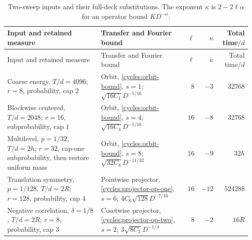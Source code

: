 \begingroup
\small
\setlength{\tabcolsep}{4pt}
\renewcommand{\arraystretch}{1.2}
\begin{longtable}{@{}p{.32\linewidth}p{.31\linewidth}r r r@{}}
\caption{Two-sweep inputs and their full-deck substitutions.
The exponent $\kappa$ is $2-2\ell\alpha$ for an operator bound
$K D^{-\alpha}$.}\label{cycles:transfer-table}\\
\toprule
Input and retained measure & Transfer and Fourier bound
 & $\ell$ & $\kappa$ & Total time$/d$\\
\midrule
\endfirsthead
\toprule
Input and retained measure & Transfer and Fourier bound
 & $\ell$ & $\kappa$ & Total time$/d$\\
\midrule
\endhead
\bottomrule
\endfoot
Coarse energy, $T/d=4096$;\newline
$r=8$, probability, cap $2$
&
Orbit, \eqref{cycles:orbit-bound}, $s=1$;\newline
$\sqrt{16C_1}D^{-5/16}$
& $8$ & $-3$ & $32768$\\
Blockwise centered, $T/d=2048$;\newline
$r=16$, subprobability, cap $1$
&
Orbit, \eqref{cycles:orbit-bound}, $s=4$;\newline
$\sqrt{16C_4}D^{-5/16}$
& $16$ & $-8$ & $32768$\\
Multilevel, $p=1/32$, $T/d=2h$;\newline
$r=32$, cap-one subprobability,\newline
then restore uniform mass
&
Orbit, \eqref{cycles:orbit-bound}, $s=8$;\newline
$\sqrt{32C_8}D^{-11/32}$
& $16$ & $-9$ & $32h$\\
Translation symmetry, $p=1/128$,\newline
$T/d=2R$; $r=128$,\newline
probability, cap $4$
&
Pointwise projector,\newline
\eqref{cycles:projector-op-one}, $s=6$;\newline
$4C_6\sqrt{128}D^{-7/16}$
& $16$ & $-12$ & $524288$\\
Negative correlation, $\delta=1/8$,\newline
$T/d=2R$; $r=8$,\newline
probability, cap $3$
&
Cosetwise projector,\newline
\eqref{cycles:projector-op-two}, $s=2$;\newline
$3\sqrt{8C_2}D^{-1/4}$
& $8$ & $-2$ & $16R$\\
\end{longtable}
\endgroup

